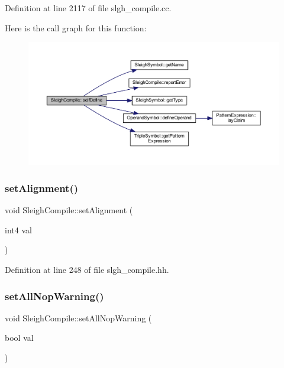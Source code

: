 Definition at line 2117 of file slgh\+\_\+compile.\+cc.

Here is the call graph for this function\+:
\nopagebreak
\begin{figure}[H]
\begin{center}
\leavevmode
\includegraphics[width=350pt]{class_sleigh_compile_a506e372776432e6ba9d06ccf0402bfa9_cgraph}
\end{center}
\end{figure}
\mbox{\label{class_sleigh_compile_a603d689850a06d968f17792238764e32}} 
\subsubsection{\texorpdfstring{setAlignment()}{setAlignment()}}
{\footnotesize\ttfamily void Sleigh\+Compile\+::set\+Alignment (\begin{DoxyParamCaption}\item[{int4}]{val }\end{DoxyParamCaption})\hspace{0.3cm}{\ttfamily [inline]}}



Definition at line 248 of file slgh\+\_\+compile.\+hh.

\mbox{\label{class_sleigh_compile_a4a1ac06e98efdf630947f401cb6c355c}} 
\subsubsection{\texorpdfstring{setAllNopWarning()}{setAllNopWarning()}}
{\footnotesize\ttfamily void Sleigh\+Compile\+::set\+All\+Nop\+Warning (\begin{DoxyParamCaption}\item[{bool}]{val }\end{DoxyParamCaption})\hspace{0.3cm}{\ttfamily [inline]}}




